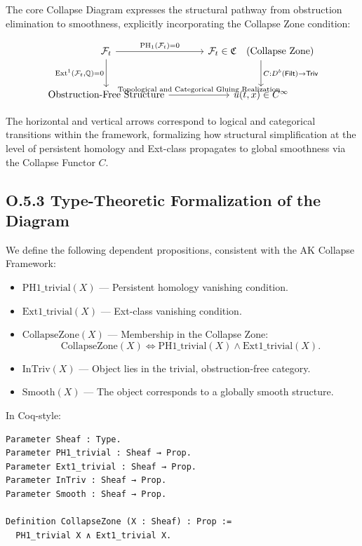 \documentclass[11pt]{article}
\begin{document}
The core Collapse Diagram expresses the structural pathway from obstruction elimination to smoothness, explicitly incorporating the Collapse Zone condition:

\[
\begin{tikzcd}[row sep=large, column sep=large]
\mathcal{F}_t
  \arrow[r, "{\mathrm{PH}_1(\mathcal{F}_t) = 0}"]
  \arrow[d, "{\mathrm{Ext}^1(\mathcal{F}_t, \mathbb{Q}) = 0}"']
& \mathcal{F}_t \in \mathfrak{C} \quad \text{(Collapse Zone)} 
  \arrow[d, "{C : D^b(\mathsf{Filt}) \to \mathsf{Triv}}"] \\
\text{Obstruction-Free Structure}
  \arrow[r, "{\text{Topological and Categorical Gluing Realization}}"]
& u(t, x) \in C^\infty
\end{tikzcd}
\]

The horizontal and vertical arrows correspond to logical and categorical transitions within the framework, formalizing how structural simplification at the level of persistent homology and Ext-class propagates to global smoothness via the Collapse Functor \( C \).

\subsection*{O.5.3 Type-Theoretic Formalization of the Diagram}

We define the following dependent propositions, consistent with the AK Collapse Framework:

\begin{itemize}
  \item \( \mathrm{PH1\_trivial}(X) \) — Persistent homology vanishing condition.
  \item \( \mathrm{Ext1\_trivial}(X) \) — Ext-class vanishing condition.
  \item \( \mathrm{CollapseZone}(X) \) — Membership in the Collapse Zone:
  \[
  \mathrm{CollapseZone}(X) \iff \mathrm{PH1\_trivial}(X) \land \mathrm{Ext1\_trivial}(X).
  \]
  \item \( \mathrm{InTriv}(X) \) — Object lies in the trivial, obstruction-free category.
  \item \( \mathrm{Smooth}(X) \) — The object corresponds to a globally smooth structure.
\end{itemize}

In Coq-style:

\begin{lstlisting}[language=Coq]
Parameter Sheaf : Type.
Parameter PH1_trivial : Sheaf → Prop.
Parameter Ext1_trivial : Sheaf → Prop.
Parameter InTriv : Sheaf → Prop.
Parameter Smooth : Sheaf → Prop.

Definition CollapseZone (X : Sheaf) : Prop :=
  PH1_trivial X ∧ Ext1_trivial X.
\end{lstlisting}
\end{document}

